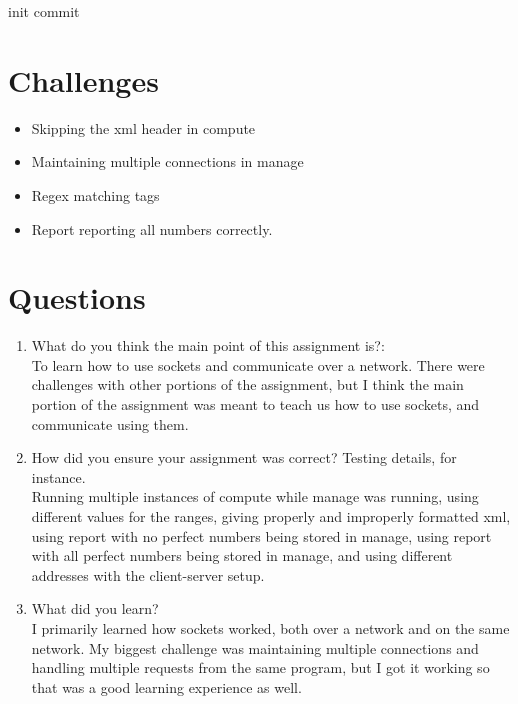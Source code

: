\documentclass[fleqn,10pt,titlepage]{article}
\begin{document}
    init commit
\clearpage

\section{Challenges}
\begin{itemize}
\item Skipping the xml header in compute
\item Maintaining multiple connections in manage
\item Regex matching tags
\item Report reporting all numbers correctly.
\end{itemize}
\clearpage

\section{Questions}
\begin{enumerate}
\item What do you think the main point of this assignment is?: \\ To learn how to use sockets and
communicate over a network. There were challenges with other portions of the assignment, but I think the main
portion of the assignment was meant to teach us how to use sockets, and communicate using them.
\item How did you ensure your assignment was correct? Testing details, for instance. \\
Running multiple instances of compute while manage was running, using
different values for the ranges, giving properly and improperly formatted xml, using report with no 
perfect numbers being stored in manage, using report with all perfect numbers being stored in manage,
and using different addresses with the client-server setup.
\item What did you learn?  \\I primarily learned how sockets worked,
both over a network and on the same network. My biggest challenge was maintaining multiple
connections and handling multiple requests from the same program, but I got it working
so that was a good learning experience as well.
\end{enumerate}
\end{document}
